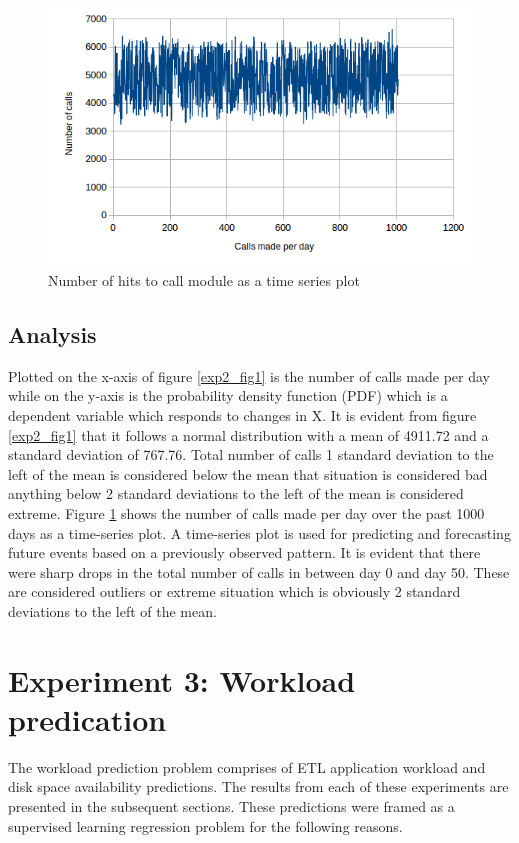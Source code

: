 \documentclass[12pt, letterpaper, titlepage]{report}
\begin{document}
\begin{figure}[h]
	\centering
	\includegraphics{time_series_plot_call_hit.png}
	\caption{Number of hits to call module as a time series plot}
	\label{exp2_fig2}
\end{figure}

\subsection{Analysis}
Plotted on the x-axis of figure \ref{exp2_fig1} is the number of calls made per day while on the y-axis is the probability density function (PDF) which is a dependent variable which responds to changes in X.
It is evident from figure \ref{exp2_fig1} that it follows a normal distribution with a mean of 4911.72 and a standard deviation of 767.76. Total number of calls 1 standard deviation to the left of the mean is considered below the mean that situation is considered bad anything below 2 standard deviations to the left of the mean is considered extreme. Figure \ref{exp2_fig2} shows the number of calls made per day over the past 1000 days as a time-series plot. A time-series plot is used for predicting and forecasting future events based on a previously observed pattern. It is evident that there were sharp drops in the total number of calls in between day 0 and day 50. These are considered outliers or extreme situation which is obviously 2 standard deviations to the left of the mean.

\section{Experiment 3: Workload predication}
The workload prediction problem comprises of ETL application workload and disk space availability predictions. The results from each of these experiments are presented in the subsequent sections. These predictions were framed as a supervised learning regression problem for the following reasons.
\end{document}
